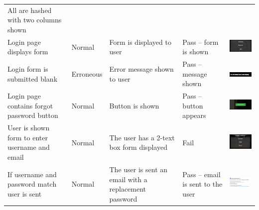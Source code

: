 \begin{center}
\begin{longtable}{|P{23mm}|P{20mm}|P{19mm}|P{20mm}|P{54mm}|}
All are hashed with two columns shown \\
Login page displays form & Normal & Form is displayed to user & Pass --
form is shown &
\includegraphics[width=51mm]{ch4_testing_for_eval/media/image9.png} \\ \hline
Login form is submitted blank & Erroneous & Error message shown to user
& Pass -- message shown &
\includegraphics[width=51mm]{ch4_testing_for_eval/media/image10.png} \\ \hline
Login page contains forgot password button & Normal & Button is shown &
Pass -- button appears &
\includegraphics[width=51mm]{ch4_testing_for_eval/media/image11.png} \\ \hline
User is shown form to enter username and email & Normal & The user has a
2-text box form displayed & Fail &
\includegraphics[width=51mm]{ch4_testing_for_eval/media/image12.png} \\ \hline
If username and password match user is sent & Normal & The user is sent
an email with a replacement password & Pass -- email is sent to the user
&
\includegraphics[width=51mm]{ch4_testing_for_eval/media/image13.png} \\ \hline

\end{longtable}
\end{center}
